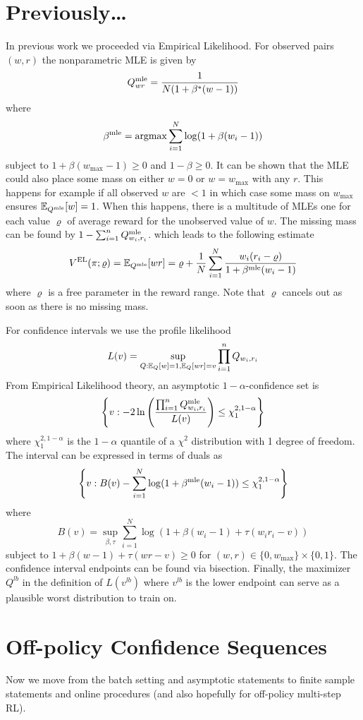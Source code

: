 \section{Previously\ldots}
In previous work we proceeded via Empirical Likelihood.
For observed pairs $(w,r)$ the nonparametric MLE is given by 
\[
Q^{\textrm{mle}}_{wr} = \frac{1}{N(1+\beta^*(w-1))}
\]
where 
\[
\beta^{\textrm{mle}} = \operatorname{argmax} \sum_{i=1}^N \log(1+\beta(w_i-1))
\]
subject to $1+\beta(w_{\max}-1)\geq 0$
and $1-\beta\geq 0$. It can be shown 
that the MLE could also 
place some mass on either $w=0$ or $w=w_{\max}$
with any $r$. This happens for example if 
all observed $w$ are $<1$ in which case some
mass on $w_{\max}$ ensures $\mathbb{E}_{Q^{\textrm{mle}}}[w]=1$.
When this happens, there is a multitude of MLEs
one for each value $\varrho$ of average reward for the 
unobserved value of $w$. The missing  
mass can be found by $1-\sum_{i=1}^n Q^{\textrm{mle}}_{w_i,r_i}$.
which leads to the following estimate
\[
V^{\textrm{EL}}(\pi;\varrho)=\mathbb{E}_{Q^{\textrm{mle}}}[wr]=\varrho+
\frac{1}{N}\sum_{i=1}^N \frac{w_i(r_i-\varrho)}{1+\beta^{\textrm{mle}}(w_i-1)}
\]
where $\varrho$ is a free parameter in the reward range.
Note that $\varrho$
cancels out as soon as there is no missing mass.

For confidence intervals we use the profile likelihood
\[
L(v)=\sup_{Q: \mathbb{E}_Q[w]=1, \mathbb{E}_Q[wr]=v} \prod_{i=1}^n Q_{w_i,r_i}
\]
From Empirical Likelihood theory, an asymptotic 
$1-\alpha$-confidence set is 
\[
\left\{v: -2\ln\left(\frac{\prod_{i=1}^n Q^{\textrm{mle}}_{w_i,r_i}}{L(v)}\right)
\leq \chi_1^{2,1-\alpha}\right\}
\]
where $\chi_1^{2,1-\alpha}$ is the $1-\alpha$ quantile of a $\chi^2$
distribution with 1 degree of freedom.
The interval can be expressed in terms of duals as
\[
\left\{v: 
B(v)-\sum_{i=1}^N\log(1+\beta^{\textrm{mle}}(w_i-1))
\leq \chi_1^{2,1-\alpha}\right\}
\]
where
\[
B(v) = \sup_{\beta,\tau} \sum_{i=1}^N \log(1+\beta(w_i-1)+\tau(w_i r_i -v))
\]
subject to $1+\beta(w-1)+\tau(wr-v)\geq 0$
for $(w,r) \in \{0,w_{\max}\}\times \{0,1\}$.
The confidence interval endpoints can be found via 
bisection. 
Finally, the maximizer $Q^{lb}$ in the definition of
$L(v^{lb})$
where $v^{lb}$ is the lower endpoint can serve as
a plausible worst distribution to train on.

\section{Off-policy Confidence Sequences}
Now we move from the batch setting and asymptotic statements to 
finite sample statements and online procedures (and also 
hopefully for off-policy multi-step RL).

